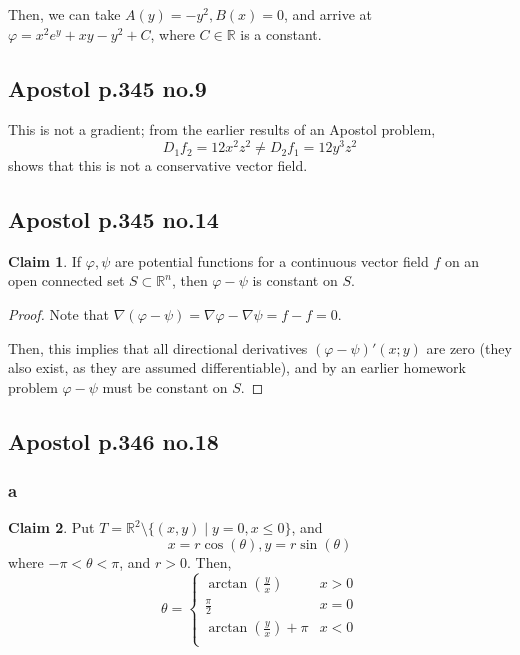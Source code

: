 \documentclass[12pt,letterpaper]{article}
\theoremstyle{definition}
\newtheorem*{claim}{Claim}
\newcommand{\R}{\mathbb{R}}
\begin{document}
Then, we can take $A(y) = -y^2, B(x) = 0$, and arrive at $\varphi =
x^2e^y+xy-y^2 + C$, where $C \in \R$ is a constant.

\subsection*{Apostol p.345 no.9}


This is not a gradient; from the earlier results of an Apostol problem,
\[
  D_1f_2 = 12x^2z^2 \neq D_2f_1 = 12y^3z^2
\]
shows that this is not a conservative vector field.

\subsection*{Apostol p.345 no.14}

\begin{claim}
  If $\varphi, \psi$ are potential functions for a continuous vector field $f$
  on an open connected set $S \subset \R^n$, then $\varphi - \psi$ is constant
  on $S$.
\end{claim}

\begin{proof}
  Note that $\nabla(\varphi - \psi) = \nabla \varphi - \nabla \psi = f - f = 0$.

  Then, this implies that all directional derivatives $(\varphi - \psi)'(x;y)$
  are zero (they also exist, as they are assumed differentiable), and by an
  earlier homework problem $\varphi - \psi$ must be constant on $S$.
\end{proof}


\subsection*{Apostol p.346 no.18}

\subsubsection*{a}

\begin{claim}
  Put $T = \R^2 \setminus \{(x,y) \mid y = 0, x \leq 0\}$, and
  \[
    x = r\cos(\theta), y = r\sin(\theta)
  \]
  where $-\pi < \theta < \pi$, and $r > 0$. Then,
  \[
    \theta =
    \begin{cases}
      \arctan(\frac{y}{x}) & x > 0\\
      \frac{\pi}{2} & x = 0 \\
      \arctan(\frac{y}{x}) + \pi & x < 0\\
    \end{cases}
  \]
\end{claim}
\end{document}
